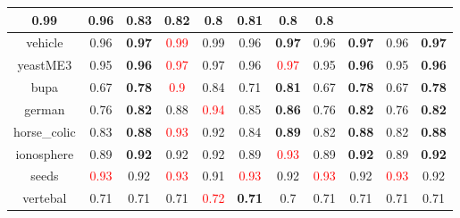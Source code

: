 \documentclass{article}%
\begin{document}
\begin{tabular}{c|cccccccccc}
{0.99
}&0.96&\textbf{0.83}&0.82&0.8&\textbf{0.81}&0.8&0.8\\%
\hline%
vehicle&0.96&\textbf{0.97}&\textcolor{red}{ 
0.99
}&0.99&0.96&\textbf{0.97}&0.96&\textbf{0.97}&0.96&\textbf{0.97}\\%
\hline%
yeastME3&0.95&\textbf{0.96}&\textcolor{red}{ 
0.97
}&0.97&0.96&\textcolor{red}{ 
0.97
}&0.95&\textbf{0.96}&0.95&\textbf{0.96}\\%
\hline%
bupa&0.67&\textbf{0.78}&\textcolor{red}{ 
0.9
}&0.84&0.71&\textbf{0.81}&0.67&\textbf{0.78}&0.67&\textbf{0.78}\\%
\hline%
german&0.76&\textbf{0.82}&0.88&\textcolor{red}{ 
0.94
}&0.85&\textbf{0.86}&0.76&\textbf{0.82}&0.76&\textbf{0.82}\\%
\hline%
horse\_colic&0.83&\textbf{0.88}&\textcolor{red}{ 
0.93
}&0.92&0.84&\textbf{0.89}&0.82&\textbf{0.88}&0.82&\textbf{0.88}\\%
\hline%
ionosphere&0.89&\textbf{0.92}&0.92&0.92&0.89&\textcolor{red}{ 
0.93
}&0.89&\textbf{0.92}&0.89&\textbf{0.92}\\%
\hline%
seeds&\textcolor{red}{ 
0.93
}&0.92&\textcolor{red}{ 
0.93
}&0.91&\textcolor{red}{ 
0.93
}&0.92&\textcolor{red}{ 
0.93
}&0.92&\textcolor{red}{ 
0.93
}&0.92\\%
\hline%
vertebal&0.71&0.71&0.71&\textcolor{red}{ 
0.72
}&\textbf{0.71}&0.7&0.71&0.71&0.71&0.71\\%
\hline%
\end{tabular}

%
\end{document}
